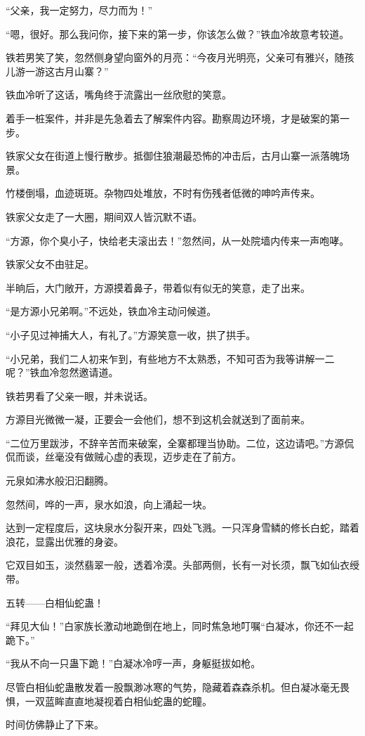\begin{this_body}
“父亲，我一定努力，尽力而为！”

“嗯，很好。那么我问你，接下来的第一步，你该怎么做？”铁血冷故意考较道。

铁若男笑了笑，忽然侧身望向窗外的月亮：“今夜月光明亮，父亲可有雅兴，随孩儿游一游这古月山寨？”

铁血冷听了这话，嘴角终于流露出一丝欣慰的笑意。

着手一桩案件，并非是先急着去了解案件内容。勘察周边环境，才是破案的第一步。

铁家父女在街道上慢行散步。抵御住狼潮最恐怖的冲击后，古月山寨一派落魄场景。

竹楼倒塌，血迹斑斑。杂物四处堆放，不时有伤残者低微的呻吟声传来。

铁家父女走了一大圈，期间双人皆沉默不语。

“方源，你个臭小子，快给老夫滚出去！”忽然间，从一处院墙内传来一声咆哮。

铁家父女不由驻足。

半晌后，大门敞开，方源摸着鼻子，带着似有似无的笑意，走了出来。

“是方源小兄弟啊。”不远处，铁血冷主动问候道。

“小子见过神捕大人，有礼了。”方源笑意一收，拱了拱手。

“小兄弟，我们二人初来乍到，有些地方不太熟悉，不知可否为我等讲解一二呢？”铁血冷忽然邀请道。

铁若男看了父亲一眼，并未说话。

方源目光微微一凝，正要会一会他们，想不到这机会就送到了面前来。

“二位万里跋涉，不辞辛苦而来破案，全寨都理当协助。二位，这边请吧。”方源侃侃而谈，丝毫没有做贼心虚的表现，迈步走在了前方。

元泉如沸水般汩汩翻腾。

忽然间，哗的一声，泉水如浪，向上涌起一块。

达到一定程度后，这块泉水分裂开来，四处飞溅。一只浑身雪鳞的修长白蛇，踏着浪花，显露出优雅的身姿。

它双目如玉，淡然翡翠一般，透着冷漠。头部两侧，长有一对长须，飘飞如仙衣绶带。

五转——白相仙蛇蛊！

“拜见大仙！”白家族长激动地跪倒在地上，同时焦急地叮嘱“白凝冰，你还不一起跪下。”

“我从不向一只蛊下跪！”白凝冰冷哼一声，身躯挺拔如枪。

尽管白相仙蛇蛊散发着一股飘渺冰寒的气势，隐藏着森森杀机。但白凝冰毫无畏惧，一双蓝眸直直地凝视着白相仙蛇蛊的蛇瞳。

时间仿佛静止了下来。


\end{this_body}
